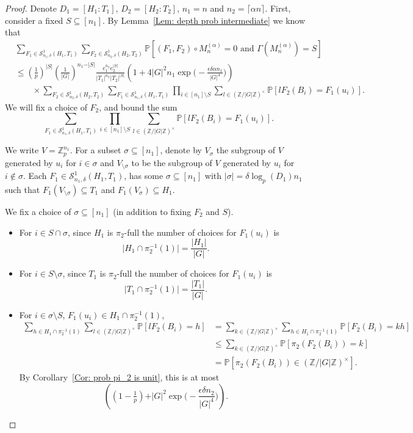 \documentclass[12pt]{amsart}
\theoremstyle{definition}
\newcommand{\PPP}{\mathbb{P}}
\newcommand{\SSO}[3]{\mathcal{S}^1_{#1}(#2,#3)}
\newcommand{\Mna}{M_{n}^{(\alpha)}}
\newcommand{\ZG}{\Z/\abs{G}\Z}
\newcommand{\abs}[1]{\vert#1\vert}
\newcommand{\Zp}{\Z_p}
\newcommand{\Z}{\mathbb{Z}}
\newcommand{\ceil}[1]{\lceil#1\rceil}
\begin{document}
\begin{proof}
Denote $D_1=[H_1:T_1]$, $D_2=[H_2:T_2]$, $n_1=n$ and $n_2=\ceil{\alpha n}$.
First, consider a fixed $S\subseteq[n_1]$. 
By Lemma~\ref{Lem: depth prob intermediate} we know that
\begin{align*}
&\sum_{F_1\in \SSO{n_1,\delta}{H_1}{T_1}}
\sum_{F_2\in \SSO{n_2,\delta}{H_2}{T_2}}
\PPP[(F_1,F_2)\circ \Mna=0 \text{ and } \Gamma(\Mna)=S]\\
&\leq (\tfrac{1}{p})^{\abs{S}} (\tfrac{1}{\abs{G}})^{n_1-\abs{S}}
\frac{e_1^{n_2} e_2^{\abs{S}}}{\abs{T_1}^{n_2} \abs{T_2}^{\abs{S}}}
\left(1+4\abs{G}^2n_1 \exp\Big(-\frac{\epsilon \delta \alpha n_1}{|G|^4}\Big) \right)\\
&\quad\quad\times 
\sum_{F_2\in \SSO{n_2,\delta}{H_2}{T_2}}
\sum_{F_1\in \SSO{n_1,\delta}{H_1}{T_1}}
\prod_{i\in [n_1]\setminus S} \sum_{l\in (\Z/\abs{G}\Z)^{\times}} \PPP[l F_2(B_i)= F_1(u_i)].
\end{align*}
We will fix a choice of $F_2$, and bound the sum
\[
\sum_{F_1\in \SSO{n_1,\delta}{H_1}{T_1}}
\prod_{i\in [n_1]\setminus S} \sum_{l\in (\Z/\abs{G}\Z)^{\times}} \PPP[l F_2(B_i)= F_1(u_i)].
\]

We write $V=\Zp^{n_1}$.
For a subset $\sigma\subseteq[n_1]$, denote by $V_{\sigma}$ the subgroup of $V$ generated by $u_i$ for $i\in \sigma$ and $V_{\setminus \sigma}$ to be the subgroup of $V$ generated by $u_i$ for $i\notin \sigma$.
Each $F_1\in \SSO{n_1,\delta}{H_1}{T_1}$, has some $\sigma\subseteq[n_1]$ with $\abs{\sigma}= \delta\log_p(D_1) n_1$ such that $F_1(V_{\setminus \sigma})\subseteq T_1$ and $F_1(V_{\sigma})\subseteq H_1$.

We fix a choice of $\sigma\subseteq [n_1]$ (in addition to fixing $F_2$ and $S$).
\begin{itemize}
    \item For $i\in S\cap \sigma$, since $H_1$ is $\pi_2$-full the number of choices for $F_1(u_i)$ is
    \[
    \abs{H_1\cap \pi_2^{-1}(1)}
    =\frac{\abs{H_1}}{\abs{G}}.
    \]
    \item For $i\in S\setminus \sigma$, since $T_1$ is $\pi_2$-full the number of choices for $F_1(u_i)$ is
    \[
    \abs{T_1\cap \pi_2^{-1}(1)}
    =\frac{\abs{T_1}}{\abs{G}}.
    \]
    \item For $i\in \sigma\setminus S$, $F_1(u_i)\in H_1\cap \pi_2^{-1}(1)$, 
    \begin{align*}
    \sum_{h\in H_1\cap \pi_2^{-1}(1)}
    \sum_{l\in (\Z/\abs{G}\Z)^{\times}} \PPP[l F_2(B_i)= h]
    &=\sum_{k\in (\Z/\abs{G}\Z)^{\times}}
    \sum_{h\in H_1\cap \pi_2^{-1}(1)}
    \PPP[F_2(B_i)= kh]\\
    &\leq \sum_{k\in (\Z/\abs{G}\Z)^{\times}}
    \PPP[\pi_2(F_2(B_i))= k]\\
    &=\PPP[\pi_2(F_2(B_i))\in (\ZG)^{\times}].
    \end{align*}
    By Corollary~\ref{Cor: prob pi_2 is unit}, this is at most
    \[
     \left( (1-\tfrac{1}{p})
     +\abs{G}^2\exp\Big(-\frac{\epsilon\delta n_2}{|G|^4}\Big) \right).
    \]


\end{itemize}
\end{proof}
\end{document}

